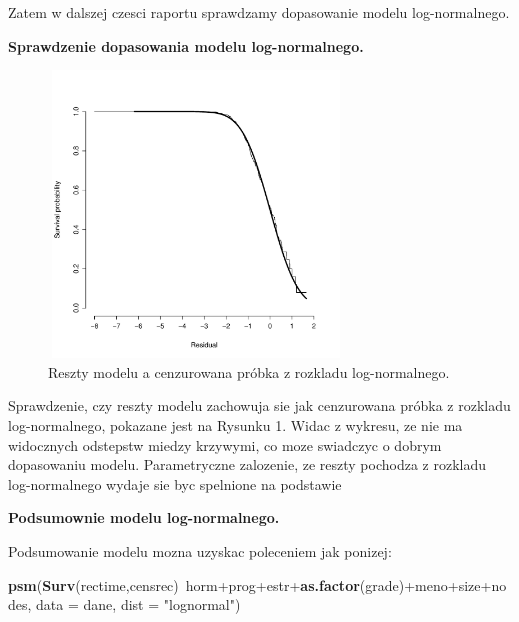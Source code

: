 \documentclass[]{article}
\newenvironment{Shaded}{}{}
\newcommand{\KeywordTok}[1]{\textcolor[rgb]{0.00,0.44,0.13}{\textbf{{#1}}}}
\newcommand{\DataTypeTok}[1]{\textcolor[rgb]{0.56,0.13,0.00}{{#1}}}
\newcommand{\StringTok}[1]{\textcolor[rgb]{0.25,0.44,0.63}{{#1}}}
\newcommand{\NormalTok}[1]{{#1}}
\begin{document}
Zatem w dalszej czesci raportu sprawdzamy dopasowanie modelu
log-normalnego.

\textbf{Sprawdzenie dopasowania modelu log-normalnego.}

\begin{figure}[hbt!]
  \vspace{-20pt}
  \begin{center}
     \includegraphics[width=0.7\textwidth, height=3in]{lognormal.pdf}
  \end{center}
  \vspace{-20pt}
  \label{fig:sc}
  \caption{Reszty modelu a cenzurowana próbka z rozkladu log-normalnego.}

\end{figure}

Sprawdzenie, czy reszty modelu zachowuja sie jak cenzurowana próbka z
rozkladu log-normalnego, pokazane jest na Rysunku 1. Widac z wykresu, ze
nie ma widocznych odstepstw miedzy krzywymi, co moze swiadczyc o dobrym
dopasowaniu modelu. Parametryczne zalozenie, ze reszty pochodza z
rozkladu log-normalnego wydaje sie byc spelnione na podstawie

\textbf{ Podsumownie modelu log-normalnego.}

Podsumowanie modelu mozna uzyskac poleceniem jak ponizej:

\begin{Shaded}
\begin{Highlighting}[]
\KeywordTok{psm}\NormalTok{(}\KeywordTok{Surv}\NormalTok{(rectime,censrec)~horm+prog+estr+}\KeywordTok{as.factor}\NormalTok{(grade)+meno+size+nodes, }
        \DataTypeTok{data =} \NormalTok{dane, }\DataTypeTok{dist =} \StringTok{"lognormal"}\NormalTok{)}
\end{Highlighting}
\end{Shaded}
\end{document}
